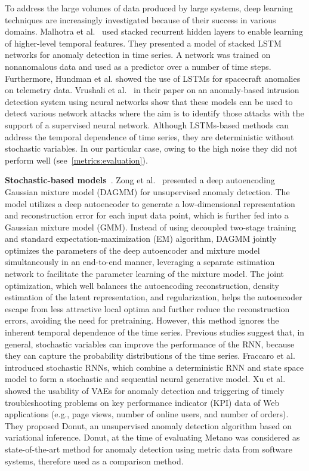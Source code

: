 To address the large volumes of data produced by large systems, deep learning techniques are increasingly investigated because of their success in various domains. Malhotra et al.~\cite{malhotra2015long} used stacked recurrent hidden layers to enable learning of higher-level temporal features. They presented a model of stacked LSTM networks for anomaly detection in time series. A network was trained on nonanomalous data and used as a predictor over a number of time steps. Furthermore, Hundman et al. \cite{Hundman:2018:DSA:3219819.3219845} showed the use of LSTMs for spacecraft anomalies on telemetry data. Vrushali et al.~\cite{vrushali2016anomaly} in their paper on an anomaly-based intrusion detection system using neural networks show that these models can be used to detect various network attacks where the aim is to identify those attacks with the support of a supervised neural network. Although LSTMs-based methods can address the temporal dependence of time series, they are deterministic without stochastic variables. In our particular case, owing to the high noise they did not perform well (see~\autoref{metrics:evaluation}).

\textbf{Stochastic-based models}~\cite{fraccaro2016sequential,zong2018deep,park2018multimodal}. 
Zong et al.~\cite{zong2018deep} presented a deep autoencoding Gaussian mixture model (DAGMM) for unsupervised anomaly detection. The model utilizes a deep autoencoder to generate a low-dimensional representation and reconstruction error for each input data point, which is further fed into a Gaussian
mixture model (GMM). Instead of using decoupled two-stage training and standard expectation-maximization (EM) algorithm, DAGMM jointly optimizes the parameters of the deep autoencoder and mixture model simultaneously in an end-to-end manner, leveraging a separate estimation network to facilitate the parameter learning of the mixture model. The joint optimization, which well balances the autoencoding reconstruction, density estimation of the latent representation, and regularization, helps the autoencoder escape from less attractive local optima and further reduce the reconstruction errors, avoiding the need for pretraining. However, this method ignores the inherent temporal dependence of the time series. Previous studies suggest that, in general, stochastic variables can improve the performance of the RNN, because they can capture the probability distributions of the time series. Fraccaro et al.~\cite{fraccaro2016sequential} introduced stochastic RNNs, which combine a deterministic RNN and state space model to form a stochastic and sequential neural generative model. Xu et al. \cite{donut} showed the usability of VAEs for anomaly detection and triggering of timely troubleshooting problems on key performance indicator (KPI) data of Web applications (e.g., page views, number of online users, and number of orders). They proposed Donut, an unsupervised anomaly detection algorithm based on variational inference. Donut, at the time of evaluating Metano was considered as state-of-the-art method for anomaly detection using metric data from software systems, therefore used as a comparison method.

